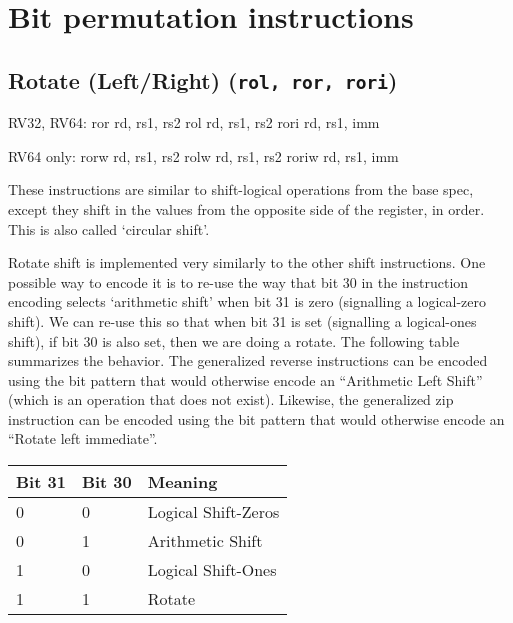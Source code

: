 \section{Bit permutation instructions}


\subsection{Rotate (Left/Right) (\texttt{rol,\ ror,\ rori})}

\begin{rvb}
  RV32, RV64:
    ror rd, rs1, rs2
    rol rd, rs1, rs2
    rori rd, rs1, imm

  RV64 only:
    rorw rd, rs1, rs2
    rolw rd, rs1, rs2
    roriw rd, rs1, imm
\end{rvb}

These instructions are similar to shift-logical operations from the base
spec, except they shift in the values from the opposite side of the
register, in order. This is also called `circular shift'.



Rotate shift is implemented very similarly to the other shift
instructions. One possible way to encode it is to re-use the way that
bit 30 in the instruction encoding selects `arithmetic shift' when bit
31 is zero (signalling a logical-zero shift). We can re-use this so that
when bit 31 is set (signalling a logical-ones shift), if bit 30 is also
set, then we are doing a rotate. The following table summarizes the
behavior. The generalized reverse instructions can be encoded using the
bit pattern that would otherwise encode an ``Arithmetic Left Shift''
(which is an operation that does not exist). Likewise, the generalized zip
instruction can be encoded using the bit pattern that would otherwise
encode an ``Rotate left immediate''.

\begin{center}
\begin{tabular}{lll}
Bit 31 & Bit 30 & Meaning \\
\hline
0 & 0 & Logical Shift-Zeros \\
0 & 1 & Arithmetic Shift \\
1 & 0 & Logical Shift-Ones \\
1 & 1 & Rotate \\
\end{tabular}
\end{center}

